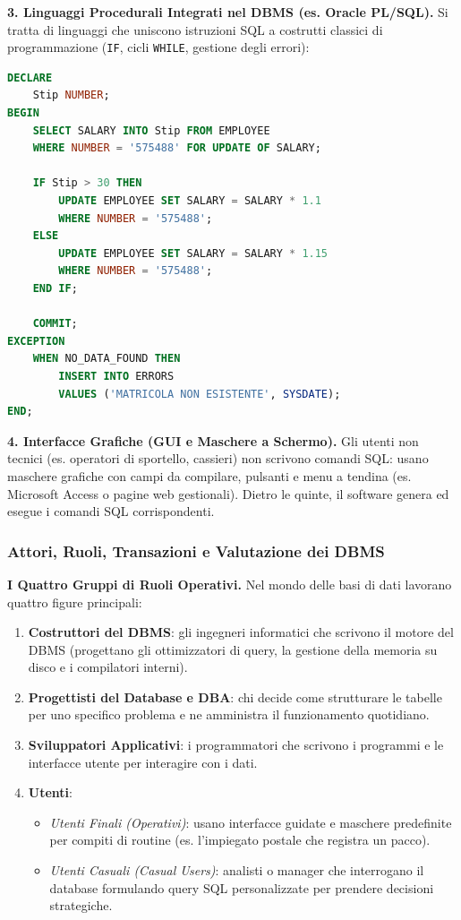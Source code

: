 \documentclass[12pt]{extarticle}
\begin{document}
\noindent \textbf{3. Linguaggi Procedurali Integrati nel DBMS (es. Oracle PL/SQL).} Si tratta di linguaggi che uniscono istruzioni SQL a costrutti classici di programmazione (\texttt{IF}, cicli \texttt{WHILE}, gestione degli errori):

\begin{lstlisting}[language=SQL, caption={Esempio di blocco procedurale PL/SQL}]
DECLARE
    Stip NUMBER;
BEGIN
    SELECT SALARY INTO Stip FROM EMPLOYEE
    WHERE NUMBER = '575488' FOR UPDATE OF SALARY;

    IF Stip > 30 THEN
        UPDATE EMPLOYEE SET SALARY = SALARY * 1.1
        WHERE NUMBER = '575488';
    ELSE
        UPDATE EMPLOYEE SET SALARY = SALARY * 1.15
        WHERE NUMBER = '575488';
    END IF;

    COMMIT;
EXCEPTION
    WHEN NO_DATA_FOUND THEN
        INSERT INTO ERRORS
        VALUES ('MATRICOLA NON ESISTENTE', SYSDATE);
END;
\end{lstlisting}

\noindent \textbf{4. Interfacce Grafiche (GUI e Maschere a Schermo).} Gli utenti non tecnici (es. operatori di sportello, cassieri) non scrivono comandi SQL: usano maschere grafiche con campi da compilare, pulsanti e menu a tendina (es. Microsoft Access o pagine web gestionali). Dietro le quinte, il software genera ed esegue i comandi SQL corrispondenti.

\subsubsection{Attori, Ruoli, Transazioni e Valutazione dei DBMS}
\noindent \textbf{I Quattro Gruppi di Ruoli Operativi.} Nel mondo delle basi di dati lavorano quattro figure principali:
\begin{enumerate}
    \item \textbf{Costruttori del DBMS}: gli ingegneri informatici che scrivono il motore del DBMS (progettano gli ottimizzatori di query, la gestione della memoria su disco e i compilatori interni).
    \item \textbf{Progettisti del Database e DBA}: chi decide come strutturare le tabelle per uno specifico problema e ne amministra il funzionamento quotidiano.
    \item \textbf{Sviluppatori Applicativi}: i programmatori che scrivono i programmi e le interfacce utente per interagire con i dati.
    \item \textbf{Utenti}:
    \begin{itemize}
        \item \textit{Utenti Finali (Operativi)}: usano interfacce guidate e maschere predefinite per compiti di routine (es. l'impiegato postale che registra un pacco).
        \item \textit{Utenti Casuali (\textit{Casual Users})}: analisti o manager che interrogano il database formulando query SQL personalizzate per prendere decisioni strategiche.
    \end{itemize}
\end{enumerate}
\end{document}
